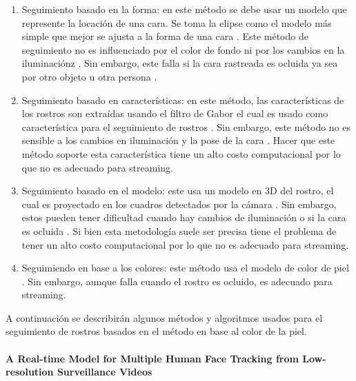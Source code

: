 \documentclass[a4paper,openright,12pt]{report}
\begin{document}
\begin{enumerate}
    \item Seguimiento basado en la forma: en este método se debe usar un modelo
    que represente la locación de una cara. Se toma la elipse como el modelo más
    simple que mejor se ajusta a la forma de una cara \cite{eleftheriadis1995automatic}. Este método de
    seguimiento no es influenciado por el color de fondo ni por los cambios en
    la iluminaciónz \cite{shaik2007robust}. Sin embargo, este falla si la cara rastreada es ocluida ya
    sea por otro objeto u otra persona \cite{shaik2007robust}.
    \item Seguimiento basado en características:  en este método, las
    características de los rostros son extraídas usando el filtro de Gabor el
    cual es usado como característica para el seguimiento de rostros \cite{shaik2007robust}. Sin
    embargo, este método no es sensible a los cambios en iluminación y la pose
    de la cara \cite{shaik2007robust}. Hacer que este método soporte esta característica tiene un alto
    costo computacional por lo que no es adecuado para streaming.
    \item Seguimiento basado en el modelo: este usa un modelo en 3D del rostro,
    el cual es proyectado en los cuadros detectados por la cámara \cite{shaik2007robust}. Sin embargo,
    estos pueden tener dificultad cuando hay cambios de iluminación o si la cara
    es ocluida \cite{smolyanskiy2014real}. Si bien esta metodología suele ser precisa tiene el problema de
    tener un alto costo computacional por lo que no es adecuado para streaming.
    \item Seguimiendo en base a los colores: este método usa el modelo de color
    de piel \cite{shaik2007robust}. Sin embargo, aunque falla cuando el rostro es ocluido, es adecuado
    para streaming.
\end{enumerate}

A continuación se describirán algunos métodos y algoritmos usados para el
seguimiento de rostros basados en el método en base al color de la piel.

\paragraph{A Real-time Model for Multiple Human Face Tracking from Low-resolution Surveillance Videos}\mbox{} \\
\end{document}
